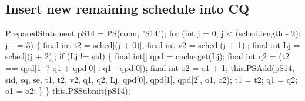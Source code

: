 \subsection{Insert new remaining schedule into CQ}
\nwenddocs{}\endmoddef{}
PreparedStatement pS14 = PS(conn, "S14");
for (int j = 0; j < (sched.length - 2); j += 3) \{
  final int t2 = sched[(j + 0)];
  final int v2 = sched[(j + 1)];
  final int Lj = sched[(j + 2)];
  if (Lj != sid) \{
    final int[] qpd = cache.get(Lj);
    final int q2 = (t2 == qpd[1] ? q1 + qpd[0] : q1 - qpd[0]);
    final int o2 = o1 + 1;
    this.PSAdd(pS14, sid, sq, se, t1, t2, v2, q1, q2, Lj,
          qpd[0], qpd[1], qpd[2], o1, o2);
    t1 = t2;
    q1 = q2;
    o1 = o2;
  \}
\}
this.PSSubmit(pS14);
\nwendcode{}\nwdocspar

